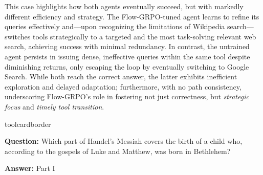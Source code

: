 This case highlights how both agents eventually succeed, but with markedly different efficiency and strategy. The Flow-GRPO-tuned \model agent learns to refine its queries effectively and—upon recognizing the limitations of Wikipedia search—switches tools strategically to a targeted and the most task-solving relevant web search, achieving success with minimal redundancy. In contrast, the untrained agent persists in issuing dense, ineffective queries within the same tool despite diminishing returns, only escaping the loop by eventually switching to Google Search. While both reach the correct answer, the latter exhibits inefficient exploration and delayed adaptation; furthermore, with no path consistency, underscoring Flow-GRPO's role in fostering not just correctness, but \textit{strategic focus} and \textit{timely tool transition}.

\begin{custombox}[title=Example from \# HotpotQA]{toolcardborder}

\textbf{Question:} Which part of Handel's Messiah covers the birth of a child who, according to the gospels of Luke and Matthew, was born in Bethlehem?

\vspace{1em}

\textbf{Answer:} Part I
\end{custombox}

